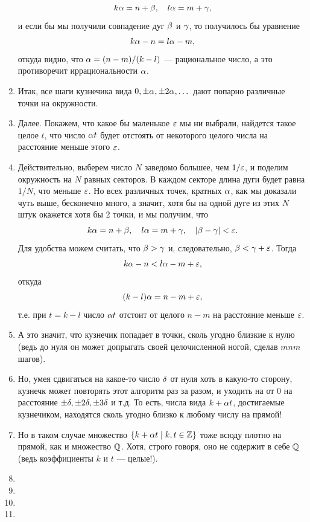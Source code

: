 \begin{enumerate}
$$
k\alpha = n + \beta,\quad l\alpha=m+\gamma,
$$
и если бы мы получили совпадение дуг $\beta$ и $\gamma$, то получилось бы уравнение
$$
k\alpha-n=l\alpha-m,
$$
откуда видно, что $\alpha=(n-m)/(k-l)$ --- рациональное число, а это противоречит иррациональности $\alpha$.
\item Итак, все шаги кузнечика вида $0,\pm\alpha,\pm 2\alpha,\dots$ дают попарно различные точки на окружности.
\item Далее. Покажем, что какое бы маленькое $\varepsilon$ мы ни выбрали, найдется такое целое $t$, что число $\alpha t$ будет отстоять от некоторого целого числа на расстояние меньше этого $\varepsilon$.
\item Действительно, выберем число $N$ заведомо большее, чем $1/\varepsilon$, и поделим окружность на $N$ равных секторов. В каждом секторе длина дуги будет равна $1/N$, что меньше $\varepsilon$. Но всех различных точек, кратных $\alpha$, как мы доказали чуть выше, бесконечно много, а значит, хотя бы на одной дуге из этих $N$ штук окажется хотя бы 2 точки, и мы получим, что
$$
k\alpha = n + \beta,\quad l\alpha=m+\gamma,\quad|\beta-\gamma|<\varepsilon.
$$
Для удобства можем считать, что $\beta>\gamma$ и, следовательно, $\beta<\gamma+\varepsilon$. Тогда
$$
k\alpha-n<l\alpha-m+\varepsilon,
$$
откуда 
$$
(k-l)\alpha = n-m+\varepsilon,
$$
т.е. при $t=k-l$ число $\alpha t$ отстоит от целого $n-m$ на расстояние меньше $\varepsilon$.
\item А это значит, что кузнечик попадает в точки, сколь угодно близкие к нулю (ведь до нуля он может допрыгать своей целочисленной ногой, сделав $mnm$ шагов).
\item Но, умея сдвигаться на какое-то число $\delta$ от нуля хоть в какую-то сторону, кузнечк может повторять этот алгоритм раз за разом, и уходить на от 0 на расстояние $\pm\delta,\pm 2\delta,\pm 3\delta$ и т.д.  То есть, числа вида $k+\alpha t$, достигаемые кузнечиком, находятся сколь угодно близко к любому числу на прямой!
\item Но в таком случае множество $\{k+\alpha t\mid k,t\in\mathbb Z\}$ тоже всюду плотно на прямой, как и множество $\mathbb Q$. Хотя, строго говоря, оно не содержит в себе $\mathbb Q$ (ведь коэффициенты $k$ и $t$ --- целые!).
\item 
\item 
\item 
\item 


\end{enumerate}


